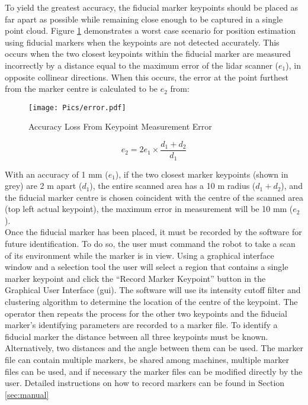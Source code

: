 To yield the greatest accuracy, the fiducial marker keypoints should be placed as far apart as possible while remaining close enough to be captured in a single point cloud. Figure \ref{fig:resacc} demonstrates a worst case scenario for position estimation using fiducial markers when the keypoints are not detected accurately. This occurs when the two closest keypoints within the fiducial marker are measured incorrectly by a distance equal to the maximum error of the \acrshort{lidar} scanner ($e_1$), in opposite collinear directions. When this occurs, the error at the point furthest from the marker centre is calculated to be $e_2$ from:

\begin{figure}[h]
\centering
\texttt{[image: Pics/error.pdf]}
\caption{Accuracy Loss From Keypoint Measurement Error}
\label{fig:resacc} 
\end{figure}

\begin{equation}
   e_2 = 2e_1\times\frac{d_1+d_2}{d_1}\label{eq:2}
\end{equation}

With an accuracy of 1 mm ($e_1$), if the two closest marker keypoints (shown in grey) are 2 m apart ($d_1$), the entire scanned area has a 10 m radius ($d_1+d_2$), and the fiducial marker centre is chosen coincident with the centre of the scanned area (top left actual keypoint), the maximum error in measurement will be 10 mm ($e_2$).\\

Once the fiducial marker has been placed, it must be recorded by the software for future identification. To do so, the user must command the robot to take a scan of its environment while the marker is in view. Using a graphical interface window and a selection tool the user will select a region that contains a single marker keypoint and click the ``Record Marker Keypoint'' button in the Graphical User Interface (\acrshort{gui}). The software will use its intensity cutoff filter and clustering algorithm to determine the location of the centre of the keypoint. The operator then repeats the process for the other two keypoints and the fiducial marker's identifying parameters are recorded to a marker file. To identify a fiducial marker the distance between all three keypoints must be known. Alternatively, two distances and the angle between them can be used. The marker file can contain multiple markers, be shared among machines, multiple marker files can be used, and if necessary the marker files can be modified directly by the user. Detailed instructions on how to record markers can be found in Section \ref{sec:manual}\\

